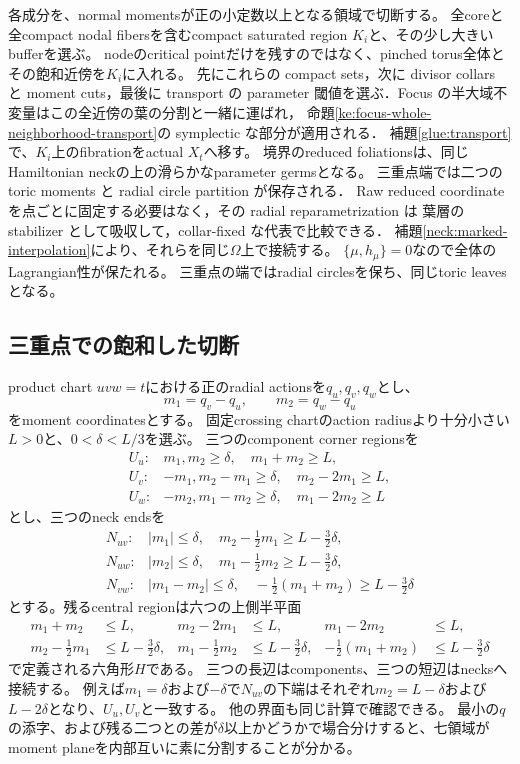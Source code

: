 各成分を、normal momentsが正の小定数以上となる領域で切断する。
全coreと全compact nodal fibersを含むcompact saturated region $K_i$と、その少し大きいbufferを選ぶ。
nodeのcritical pointだけを残すのではなく、pinched torus全体とその飽和近傍を$K_i$に入れる。
先にこれらの compact sets，次に divisor collars と moment cuts，最後に transport の
parameter 閾値を選ぶ．Focus の半大域不変量はこの全近傍の葉の分割と一緒に運ばれ，
命題\ref{ke:focus-whole-neighborhood-transport}の symplectic な部分が適用される．
補題\ref{glue:transport}で、$K_i$上のfibrationをactual $X_t$へ移す。
境界のreduced foliationsは、同じHamiltonian neckの上の滑らかなparameter germsとなる。
三重点端では二つの toric moments と radial circle partition が保存される．
Raw reduced coordinate を点ごとに固定する必要はなく，その radial reparametrization は
葉層の stabilizer として吸収して，collar-fixed な代表で比較できる．
補題\ref{neck:marked-interpolation}により、それらを同じ$\Omega$上で接続する。
$\{\mu,h_\mu\}=0$なので全体のLagrangian性が保たれる。
三重点の端ではradial circlesを保ち、同じtoric leavesとなる。

\subsection{三重点での飽和した切断}\label{glue:hexagon}
product chart $uvw=t$における正のradial actionsを$q_u,q_v,q_w$とし、
\[
m_1=q_v-q_u,\qquad m_2=q_w-q_u
\]
をmoment coordinatesとする。
固定crossing chartのaction radiusより十分小さい$L>0$と、$0<\delta<L/3$を選ぶ。
三つのcomponent corner regionsを
\[
\begin{array}{ll}
U_u:&m_1,m_2\ge\delta,\quad m_1+m_2\ge L,\\
U_v:&-m_1,m_2-m_1\ge\delta,\quad m_2-2m_1\ge L,\\
U_w:&-m_2,m_1-m_2\ge\delta,\quad m_1-2m_2\ge L
\end{array}
\]
とし、三つのneck endsを
\[
\begin{array}{ll}
N_{uv}:&|m_1|\le\delta,\quad m_2-\frac12m_1\ge L-\frac32\delta,\\
N_{uw}:&|m_2|\le\delta,\quad m_1-\frac12m_2\ge L-\frac32\delta,\\
N_{vw}:&|m_1-m_2|\le\delta,\quad-\frac12(m_1+m_2)\ge L-\frac32\delta
\end{array}
\]
とする。残るcentral regionは六つの上側半平面
\begin{align*}
m_1+m_2&\le L,&m_2-2m_1&\le L,&m_1-2m_2&\le L,\\
m_2-\tfrac12m_1&\le L-\tfrac32\delta,&
m_1-\tfrac12m_2&\le L-\tfrac32\delta,&
-\tfrac12(m_1+m_2)&\le L-\tfrac32\delta
\end{align*}
で定義される六角形$H$である。
三つの長辺はcomponents、三つの短辺はnecksへ接続する。
例えば$m_1=\delta$および$-\delta$で$N_{uv}$の下端はそれぞれ$m_2=L-\delta$および$L-2\delta$となり、$U_u,U_v$と一致する。
他の界面も同じ計算で確認できる。
最小の$q$の添字、および残る二つとの差が$\delta$以上かどうかで場合分けすると、七領域がmoment planeを内部互いに素に分割することが分かる。

